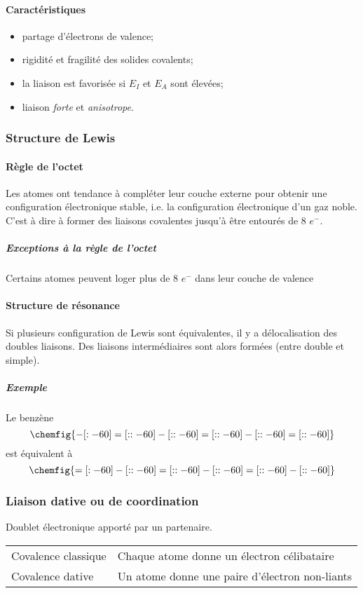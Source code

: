 \paragraph{Caractéristiques}
\begin{itemize}
  \item partage d'électrons de valence;
  \item rigidité et fragilité des solides covalents;
  \item la liaison est favorisée si $E_I$ et $E_A$ sont élevées;
  \item liaison \emph{forte} et \emph{anisotrope}.
\end{itemize}
\subsubsection{Structure de Lewis}
\paragraph{Règle de l'octet}
Les atomes ont tendance à compléter leur couche externe pour obtenir une configuration électronique stable,
i.e. la configuration électronique d'un gaz noble.
C'est à dire à former des liaisons covalentes jusqu'à être entourés de 8 $e^-$.
\subparagraph{Exceptions à la règle de l'octet}
Certains atomes peuvent loger plus de 8 $e^-$ dans leur couche de valence

\paragraph{Structure de résonance}
Si plusieurs configuration de Lewis sont équivalentes,
il y a délocalisation des doubles liaisons.
Des liaisons intermédiaires sont alors formées (entre double et simple).
\subparagraph{Exemple} Le benzène
$$\chemfig{-[:-60]=[::-60]-[::-60]=[::-60]-[::-60]=[::-60]}$$ est équivalent à $$\chemfig{=[:-60]-[::-60]=[::-60]-[::-60]=[::-60]-[::-60]}$$

\subsubsection{Liaison dative ou de coordination}
Doublet électronique apporté par un partenaire.

\begin{center}
  \begin{tabular}{ll}
    Covalence classique & Chaque atome donne un électron célibataire\\
    Covalence dative & Un atome donne une paire d'électron non-liants
  \end{tabular}
\end{center}

